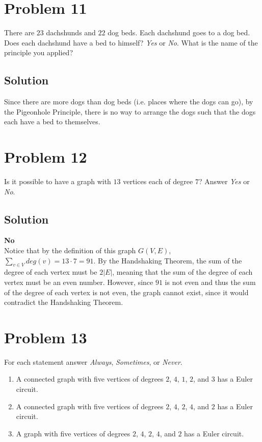 \documentclass[table]{article}
\begin{document}
\section{Problem 11}
There are $23$ dachshunds and $22$ dog beds. Each dachshund goes to a dog bed. Does each dachshund have a bed to himself? \textit{Yes} or \textit{No}. What is the name of the principle you applied?
\subsection{Solution}
Since there are more dogs than dog beds (i.e. places where the dogs can go), by the Pigeonhole Principle, there is no way to arrange the dogs such that the dogs each have a bed to themselves.
\section{Problem 12}
Is it possible to have a graph with $13$ vertices each of degree $7$? Answer \textit{Yes} or \textit{No}.
\subsection{Solution}
\textbf{No}\\
Notice that by the definition of this graph $G(V, E)$, $\sum_{v \in V}^{} deg(v) = 13 \cdot 7 = 91$. By the Handshaking Theorem, the sum of the degree of each vertex must be $2|E|$, meaning that the sum of the degree of each vertex must be an even number. However, since $91$ is not even and thus the sum of the degree of each vertex is not even, the graph cannot exist, since it would contradict the Handshaking Theorem.
\section{Problem 13}
For each statement answer \textit{Always}, \textit{Sometimes}, or \textit{Never}.
\begin{enumerate}[nosep,label=\alph*)]
\item A connected graph with five vertices of degrees $2$, $4$, $1$, $2$, and $3$ has a Euler circuit.
\item A connected graph with five vertices of degrees $2$, $4$, $2$, $4$, and $2$ has a Euler circuit.
\item A graph with five vertices of degrees $2$, $4$, $2$, $4$, and $2$ has a Euler circuit.
\end{enumerate}
\end{document}
